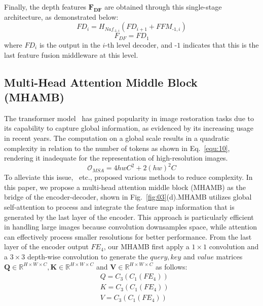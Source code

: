 \documentclass[sn-mathphys,Numbered]{sn-jnl}
\theoremstyle{thmstyleone}\newtheorem{theorem}{Theorem}\newtheorem{proposition}[theorem]{Proposition}
\theoremstyle{thmstyletwo}\newtheorem{example}{Example}\newtheorem{remark}{Remark}
\theoremstyle{thmstylethree}\newtheorem{definition}{Definition}
\begin{document}
Finally, the depth features $\mathbf{F_{DF}}$ are obtained through this single-stage architecture, as demonstrated below:
\begin{equation}
	\label{equ:08}
    FD_{i} =  H_{Naf_{\textrm{-1},i}}(FD_{i+1} + FFM_{\textrm{-1},i}) 
\end{equation}
\begin{equation}
	\label{equ:09}
    F_{DF} = FD_{1}  
\end{equation}
where $FD_i$ is the output in the $i$-th level decoder, and -$1$ indicates that this is the last feature fusion middleware at this level.

\subsection{Multi-Head Attention Middle Block (MHAMB)}
The transformer model~\cite{Wang_2022_CVPR,Zamir2021Restormer,Tsai2022Stripformer} has gained popularity in image restoration tasks due to its capability to capture global information, as evidenced by its increasing usage in recent years. The computation on a global scale results in a quadratic complexity in relation to the number of tokens as shown in Eq.~\ref{equ:10}, rendering it inadequate for the representation of high-resolution images.
\begin{equation}
	\label{equ:10}
    \mathcal{O}_{MSA} = 4hwC^2 + 2(hw)^2C  
\end{equation}
To alleviate this issue,~\cite{Tsai2022Stripformer,Zamir2021Restormer,liang2021swinir} etc., proposed various methods to reduce complexity. In this paper, we propose a  multi-head attention middle block (MHAMB) as the bridge of the encoder-decoder, shown in Fig.~\ref{fig:03}(d).MHAMB utilizes global self-attention to process and integrate the feature map information that is generated by the last layer of the encoder. This approach is particularly efficient in handling large images because convolution downsamples space, while attention can effectively process smaller resolutions for better performance.
From the last layer of the encoder output $FE_4$, our MHAMB first apply a $1 \times 1$ convolution and a $3 \times 3$ depth-wise convolution to generate the $query, key$ and $value$ matrices $\mathbf{Q} \in \mathbb R^{H \times W \times C}, \mathbf{K} \in \mathbb R^{H \times W \times C}$ and $\mathbf{V} \in \mathbb R^{H \times W \times C}$ as follows:
\begin{equation}
\begin{aligned}
	\label{equ:11}
    &Q = C_3(C_1(FE_4))  \\
    &K = C_3(C_1(FE_4))  \\
    &V = C_3(C_1(FE_4))
\end{aligned}
\end{equation}
\end{document}
